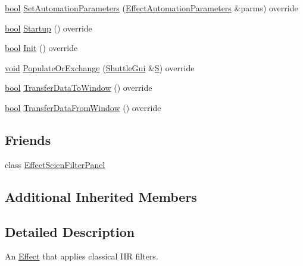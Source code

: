 \begin{DoxyCompactItemize}
\item 
\hyperlink{mac_2config_2i386_2lib-src_2libsoxr_2soxr-config_8h_abb452686968e48b67397da5f97445f5b}{bool} \hyperlink{class_effect_scien_filter_a7d5bf035fb8d6d2948ea6feac9f2b85c}{Set\+Automation\+Parameters} (\hyperlink{class_effect_automation_parameters}{Effect\+Automation\+Parameters} \&parms) override
\item 
\hyperlink{mac_2config_2i386_2lib-src_2libsoxr_2soxr-config_8h_abb452686968e48b67397da5f97445f5b}{bool} \hyperlink{class_effect_scien_filter_a6f43060d33f7762ce7a542f140fc5ef8}{Startup} () override
\item 
\hyperlink{mac_2config_2i386_2lib-src_2libsoxr_2soxr-config_8h_abb452686968e48b67397da5f97445f5b}{bool} \hyperlink{class_effect_scien_filter_ac5f6c0a907268e45910266c1e45e4a1d}{Init} () override
\item 
\hyperlink{sound_8c_ae35f5844602719cf66324f4de2a658b3}{void} \hyperlink{class_effect_scien_filter_a2898278811c2d1776a6d4df212c4a233}{Populate\+Or\+Exchange} (\hyperlink{class_shuttle_gui}{Shuttle\+Gui} \&\hyperlink{xlftab_8c_af933676109efed7ab34cea71d748a517}{S}) override
\item 
\hyperlink{mac_2config_2i386_2lib-src_2libsoxr_2soxr-config_8h_abb452686968e48b67397da5f97445f5b}{bool} \hyperlink{class_effect_scien_filter_afca5e4989508889b4bb22f83b8c679f4}{Transfer\+Data\+To\+Window} () override
\item 
\hyperlink{mac_2config_2i386_2lib-src_2libsoxr_2soxr-config_8h_abb452686968e48b67397da5f97445f5b}{bool} \hyperlink{class_effect_scien_filter_ac42d1b9b462097df1cb07eb15e0d04bc}{Transfer\+Data\+From\+Window} () override
\end{DoxyCompactItemize}
\subsection*{Friends}
\begin{DoxyCompactItemize}
\item 
class \hyperlink{class_effect_scien_filter_a372c93f20715e9647f82ab5cdaddd218}{Effect\+Scien\+Filter\+Panel}
\end{DoxyCompactItemize}
\subsection*{Additional Inherited Members}


\subsection{Detailed Description}
An \hyperlink{class_effect}{Effect} that applies \textquotesingle{}classical\textquotesingle{} I\+IR filters. 

